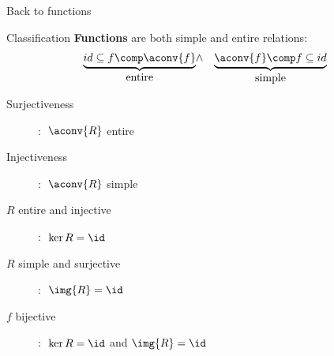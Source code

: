 \documentclass{beamer}
\begin{document}
\begin{slide}{Back to functions}

\begin{block}{Classification}
\textbf{Functions} are both simple and entire relations:
\begin{eqnarray*}
        \underbrace{id \subseteq f \comp \aconv{f}}_{\mbox{entire}}
&\wedge&
        \underbrace{\aconv{f}\comp f  \subseteq id}_{\mbox{simple}}
\end{eqnarray*}
\begin{description}
\item[Surjectiveness]: $\; \aconv{R}$ entire
\item[Injectiveness]: $\; \aconv{R}$ simple
\end{description}

\begin{description}
\item[$R$ entire and injective]: $\; \ker{R} = \id$
\item[$R$ simple and surjective]: $\; \img{R} = \id$
\item[$f$ bijective]: $\; \ker{R} = \id$ and $\img{R} = \id$
\end{description}
\end{block}
\end{slide}
\end{document}
